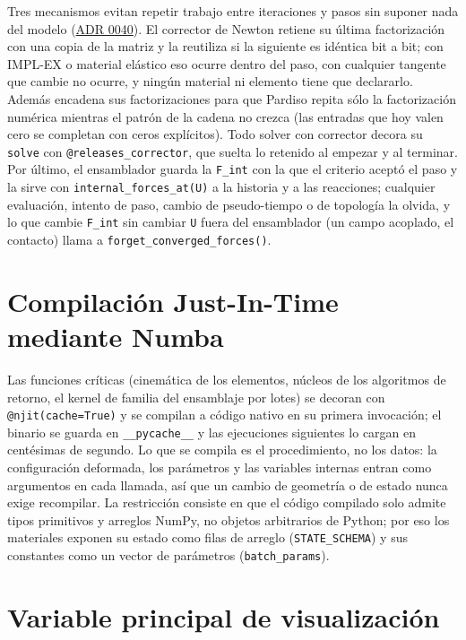 \documentclass[11pt,oneside]{report}
\begin{document}
Tres mecanismos evitan repetir trabajo entre iteraciones y pasos sin suponer nada del modelo (\hyperref[adr:0040]{ADR 0040}). El corrector de Newton retiene su última factorización con una copia de la matriz y la reutiliza si la siguiente es idéntica bit a bit; con IMPL-EX o material elástico eso ocurre dentro del paso, con cualquier tangente que cambie no ocurre, y ningún material ni elemento tiene que declararlo. Además encadena sus factorizaciones para que Pardiso repita sólo la factorización numérica mientras el patrón de la cadena no crezca (las entradas que hoy valen cero se completan con ceros explícitos). Todo solver con corrector decora su \texttt{solve} con \texttt{@releases\_\allowbreak{}corrector}, que suelta lo retenido al empezar y al terminar. Por último, el ensamblador guarda la \texttt{F\_int} con la que el criterio aceptó el paso y la sirve con \texttt{internal\_\allowbreak{}forces\_\allowbreak{}at(U)} a la historia y a las reacciones; cualquier evaluación, intento de paso, cambio de pseudo-tiempo o de topología la olvida, y lo que cambie \texttt{F\_int} sin cambiar \texttt{U} fuera del ensamblador (un campo acoplado, el contacto) llama a \texttt{forget\_\allowbreak{}converged\_\allowbreak{}forces()}.

\section{Compilación Just-In-Time mediante Numba}

Las funciones críticas (cinemática de los elementos, núcleos de los algoritmos de retorno, el kernel de familia del ensamblaje por lotes) se decoran con \texttt{@njit(cache=True)} y se compilan a código nativo en su primera invocación; el binario se guarda en \texttt{\_\_pycache\_\_} y las ejecuciones siguientes lo cargan en centésimas de segundo. Lo que se compila es el procedimiento, no los datos: la configuración deformada, los parámetros y las variables internas entran como argumentos en cada llamada, así que un cambio de geometría o de estado nunca exige recompilar. La restricción consiste en que el código compilado solo admite tipos primitivos y arreglos NumPy, no objetos arbitrarios de Python; por eso los materiales exponen su estado como filas de arreglo (\texttt{STATE\_SCHEMA}) y sus constantes como un vector de parámetros (\texttt{batch\_params}).

\section{Variable principal de visualización}
\end{document}
